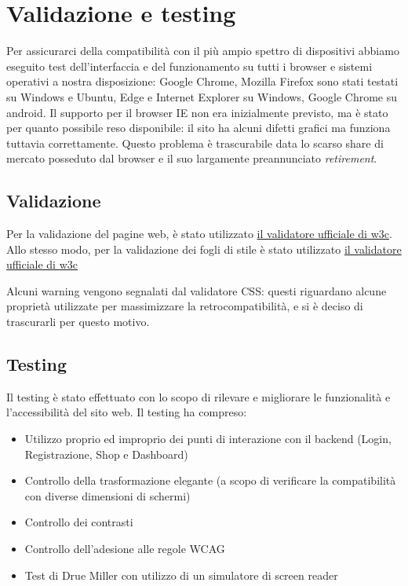 \section{Validazione e testing}
Per assicurarci della compatibilità con il più ampio spettro di dispositivi abbiamo eseguito test dell'interfaccia e del funzionamento su tutti i browser e sistemi operativi a nostra disposizione: Google Chrome, Mozilla Firefox sono stati testati su Windows e Ubuntu, Edge e Internet Explorer su Windows, Google Chrome su android.
Il supporto per il browser IE non era inizialmente previsto, ma è stato per quanto possibile reso disponibile: il sito ha alcuni difetti grafici ma funziona tuttavia correttamente. Questo problema è trascurabile data lo scarso share di mercato posseduto dal browser e il suo largamente preannunciato \textit{retirement}.


\subsection{Validazione}
Per la validazione del pagine web, è stato utilizzato \href{https://validator.w3.org/}{il validatore ufficiale di w3c}.
Allo stesso modo, per la validazione dei fogli di stile è stato utilizzato \href{https://jigsaw.w3.org/css-validator/}{il validatore ufficiale di w3c}


Alcuni warning vengono segnalati dal validatore CSS: questi riguardano alcune proprietà utilizzate per massimizzare la retrocompatibilità, e si è deciso di trascurarli per questo motivo.

\subsection{Testing}
Il testing è stato effettuato con lo scopo di rilevare e migliorare le funzionalità e l'accessibilità del sito web.
Il testing ha compreso:
\begin{itemize}
    \item Utilizzo proprio ed improprio dei punti di interazione con il backend (Login, Registrazione, Shop e Dashboard)
    \item Controllo della trasformazione elegante (a scopo di verificare la compatibilità con diverse dimensioni di schermi)
    \item Controllo dei contrasti
    \item Controllo dell'adesione alle regole WCAG
    \item Test di Drue Miller con utilizzo di un simulatore di screen reader
\end{itemize}

